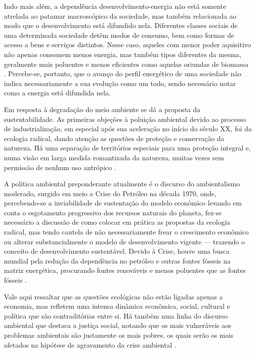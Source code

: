 Indo mais além, a dependência desenvolvimento-energia não está somente
atrelada ao patamar macroscópico da sociedade, mas também relacionada
ao modo que o desenvolvimento está difundido nela. Diferentes classes
sociais de uma determinada sociedade detêm modos de consumo, bem como
formas de acesso a bens e serviços distintos. Nesse caso, aqueles com
menor poder aquisitivo não apenas consomem menos energia, mas também
tipos diferentes da mesma, geralmente mais poluentes e menos
eficientes como aquelas oriundas de biomassa
\cite{rippel}. Percebe-se, portanto, que o avanço do perfil energético
de uma sociedade não indica necessariamente a sua evolução como um
todo, sendo necessário notar como a energia está difundida nela.

Em resposta à degradação do meio ambiente se dá a proposta da
sustentabilidade. As primeiras objeções à poluição ambiental devido ao processo 
de industrialização, em especial após sua aceleração no início do século XX,
foi da ecologia radical, dando atenção as questões de proteção e conservação da natureza.
Há uma separação de territórios especiais para uma proteção integral e, numa
visão em larga medida romantizada da natureza, muitas vezes sem permissão 
de nenhum uso antrópico \cite{jatoba}.

A política ambiental preponderante atualmente é o discurso do ambientalismo moderado, 
surgido em meio a Crise do Petróleo na década 1970, onde, percebendo-se a
inviabilidade de sustentação do modelo econômico levando em conta o esgotamento
progressivo dos recursos naturais do planeta, fez-se necessário a discussão de como 
colocar em prática as propostas da ecologia radical, mas tendo cautela de não 
necessariamente frear o crescimento econômico ou alterar substancialmente o 
modelo de desenvolvimento vigente --- trazendo o conceito de desenvolvimento
sustentável. Devido à Crise, houve uma busca mundial pela redução da 
dependência no petróleo e outras fontes fósseis na matriz energética, 
procurando fontes renováveis e menos poluentes que as fontes fósseis 
\cite{jatoba,epe_eficiencia_2012,rippel}. 

Vale aqui ressaltar que as questões ecológicas não estão ligadas apenas a
economia, mas refletem uma intensa dinâmica econômica, social, cultural e política 
que são contraditórias entre si. Há também uma linha do discurso ambiental que destaca a
justiça social, notando que os mais vulneráveis aos problemas
ambientais são justamente os mais pobres, os quais serão os mais afetados na
hipótese de agravamento da crise ambiental \cite{jatoba}.

